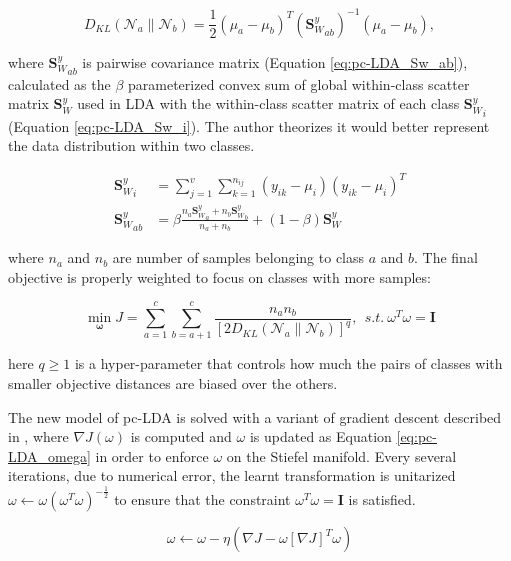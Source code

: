         \begin{equation}
            D_{KL}\left(\mathcal{N}_a\parallel\mathcal{N}_b\right)=\frac{1}{2}\left(\mu_a-\mu_b\right)^{T}{\left({\boldsymbol{S}_W^y}_{ab}\right)}^{-1}\left(\mu_a-\mu_b\right),
        \end{equation}

        where ${\boldsymbol{S}_W^y}_{ab}$ is pairwise covariance matrix (Equation \eqref{eq:pc-LDA_Sw_ab}), calculated as the $\beta$ parameterized convex sum of global within-class scatter matrix $\boldsymbol{S}_W^y$ used in LDA with the within-class scatter matrix of each class ${\boldsymbol{S}_W^y}_i$ (Equation \eqref{eq:pc-LDA_Sw_i}).
        The author theorizes it would better represent the data distribution within two classes.

        \begin{align}
            {\boldsymbol{S}_W^y}_i &= \sum_{j=1}^{v}\sum_{k=1}^{n_{ij}}{\left(y_{ik}-\mu_i\right)\left(y_{ik}-\mu_i\right)^T} \label{eq:pc-LDA_Sw_i}\\
            {\boldsymbol{S}_W^y}_{ab} &= \beta\frac{n_a{\boldsymbol{S}_W^y}_a+n_b{\boldsymbol{S}_W^y}_b}{n_a+n_b}+\left(1-\beta\right){\boldsymbol{S}_W^y}
            \label{eq:pc-LDA_Sw_ab}
        \end{align}

        where $n_a$ and $n_b$ are number of samples belonging to class $a$ and $b$. The final objective is properly weighted to focus on classes with more samples:

        \begin{equation}
            \operatorname*{min}_{\boldsymbol{\omega}}{J}=\sum_{a=1}^{c}\sum_{b=a+1}^{c}{\frac{n_an_b}{{[2D_{KL}\left(\mathcal{N}_a\parallel\mathcal{N}_b\right)]}^q}},\ \ s.t.\ \omega^T\omega=\boldsymbol{I}
            \label{eq:pc-LDA}
        \end{equation}

        here $q\ge1$ is a hyper-parameter that controls how much the pairs of classes with smaller objective distances are biased over the others.

        The new model of pc-LDA is solved with a variant of gradient descent described in \cite{kong2014pairwise}, where $\nabla J\left(\omega\right)$ is computed and $\omega$ is updated as Equation \eqref{eq:pc-LDA_omega} in order to enforce $\omega$ on the Stiefel manifold. Every several iterations, due to numerical error, the learnt transformation is unitarized $\omega \leftarrow \omega{\left(\omega^T\omega\right)}^{-\frac{1}{2}}$ to ensure that the constraint $\omega^T\omega = \boldsymbol{I}$ is satisfied.

        \begin{equation}
            \omega \leftarrow \omega - \eta\left(\nabla J - \omega{[\nabla J]}^T\omega\right)
            \label{eq:pc-LDA_omega}
        \end{equation}
